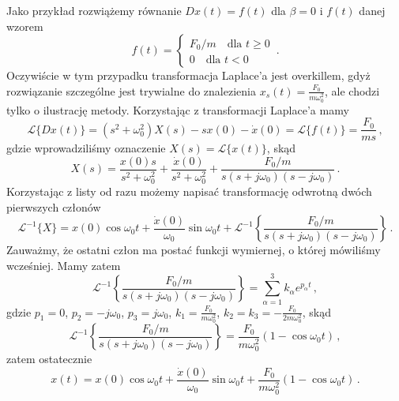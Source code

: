 \documentclass[../main.tex]{subfiles}
\begin{document}
Jako przykład rozwiążemy równanie \(Dx(t)=f(t)\) dla \(\beta=0\) i \(f(t)\) danej wzorem
\begin{equation*}
    f(t)=\begin{cases}F_0/m\quad\text{dla \(t\geq0\)}\\ 0\quad\text{dla \(t<0\)}\end{cases}\,.
\end{equation*}
Oczywiście w tym przypadku transformacja Laplace'a jest overkillem, gdyż rozwiązanie szczególne jest
trywialne do znalezienia \(x_s(t)=\frac{F_0}{m\omega_0^2}\), ale chodzi tylko o ilustrację metody.
Korzystając z transformacji Laplace'a mamy
\begin{equation*}
    \mathscr{L}\{Dx(t)\}=(s^2+\omega_0^2)X(s)-sx(0)-\dot x(0)=\mathscr{L}\{f(t)\}=\frac{F_0}{ms}\,,
\end{equation*}
gdzie wprowadziliśmy oznaczenie \(X(s)=\mathscr{L}\{x(t)\}\), skąd
\begin{equation*}
    X(s)=\frac{x(0)s}{s^2+\omega_0^2}+\frac{\dot x(0)}{s^2+\omega_0^2}+\frac{F_0/m}{s(s+j\omega_0)(s-j\omega_0)}\,.
\end{equation*}
Korzystając z listy od razu możemy napisać transformację odwrotną dwóch pierwszych członów
\begin{equation*}
    \mathscr{L}^{-1}\{X\}=x(0)\cos\omega_0t+\frac{\dot x(0)}{\omega_0}\sin\omega_0t+\mathscr{L}^{-1}\left\{\frac{F_0/m}{s(s+j\omega_0)(s-j\omega_0)}\right\}\,.
    \end{equation*}
    Zauważmy, że ostatni człon ma postać funkcji wymiernej, o której mówiliśmy wcześniej. Mamy zatem
    \begin{equation*}
        \mathscr{L}^{-1}\left\{\frac{F_0/m}{s(s+j\omega_0)(s-j\omega_0)}\right\}=\sum_{\alpha=1}^3k_\alpha e^{p_\alpha t}\,,
    \end{equation*}
    gdzie \(p_1=0\), \(p_2=-j\omega_0\), \(p_3=j\omega_0\), \(k_1=\frac{F_0}{m\omega_0^2}\),
    \(k_2=k_3=-\frac{F_0}{2m\omega_0^2}\), skąd
    \begin{equation*}
        \mathscr{L}^{-1}\left\{\frac{F_0/m}{s(s+j\omega_0)(s-j\omega_0)}\right\}=\frac{F_0}{m\omega_0^2}\left(1-\cos\omega_0t\right)\,,
    \end{equation*}
    zatem ostatecznie
    \begin{equation*}
        x(t)=x(0)\cos\omega_0t+\frac{\dot x(0)}{\omega_0}\sin\omega_0t+\frac{F_0}{m\omega_0^2}\left(1-\cos\omega_0t\right)\,.
    \end{equation*}
    
\end{document}
